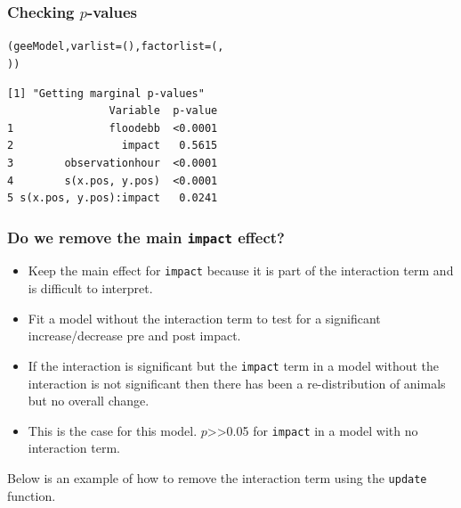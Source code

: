 \begin{frame}[fragile]
\frametitle{Checking $p$-values}
\begin{knitrout}\footnotesize
{}\color{fgcolor}\begin{kframe}
\begin{alltt}
(geeModel, varlist = (), factorlist = (, 
    ))
\end{alltt}
\begin{verbatim}
[1] "Getting marginal p-values"
                Variable  p-value
1               floodebb  <0.0001
2                 impact   0.5615
3        observationhour  <0.0001
4        s(x.pos, y.pos)  <0.0001
5 s(x.pos, y.pos):impact   0.0241
\end{verbatim}
\end{kframe}
\end{knitrout}

\end{frame}


\begin{frame}[fragile]
\frametitle{Do we remove the main {\tt impact} effect?}
\begin{itemize}
\item Keep the main effect for {\tt impact} because it is part of the interaction term and is difficult to interpret.\\
\item Fit a model without the interaction term to test for a significant increase/decrease pre and post impact.\\
\item If the interaction is significant but the {\tt impact} term in a model without the interaction is not significant then there has been a re-distribution of animals but no overall change.\\
\item This is the case for this model.  $p$>>0.05 for {\tt impact} in a model with no interaction term.\\
\end{itemize}

\bigskip
Below is an example of how to remove the interaction term using the {\tt update} function.
\end{frame}

